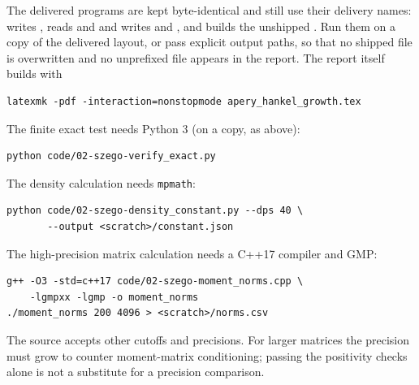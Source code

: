 \documentclass[11pt,a4paper]{article}
\numberwithin{equation}{section}
\theoremstyle{remark}\newtheorem{remark}[theorem]{Remark}
\begin{document}
The delivered programs are kept byte-identical and still use their delivery
names:  writes
, 
reads  and  and writes
 and ,
and  builds the unshipped
. Run them on a copy of the delivered
layout, or pass explicit output paths, so that no shipped file is
overwritten and no unprefixed file appears in the report. The report itself
builds with
\begin{verbatim}
latexmk -pdf -interaction=nonstopmode apery_hankel_growth.tex
\end{verbatim}
The finite exact test needs Python 3 (on a copy, as above):
\begin{verbatim}
python code/02-szego-verify_exact.py
\end{verbatim}
The density calculation needs \texttt{mpmath}:
\begin{verbatim}
python code/02-szego-density_constant.py --dps 40 \
       --output <scratch>/constant.json
\end{verbatim}
The high-precision matrix calculation needs a C++17 compiler and GMP:
\begin{verbatim}
g++ -O3 -std=c++17 code/02-szego-moment_norms.cpp \
    -lgmpxx -lgmp -o moment_norms
./moment_norms 200 4096 > <scratch>/norms.csv
\end{verbatim}
The source accepts other cutoffs and precisions. For larger matrices the
precision must grow to counter moment-matrix conditioning; passing the
positivity checks alone is not a substitute for a precision comparison.
\end{document}
